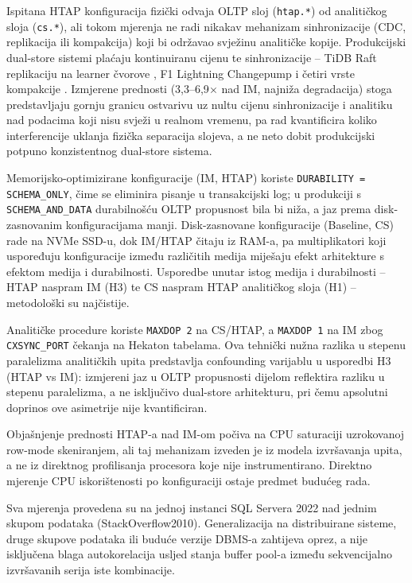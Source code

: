 Ispitana HTAP konfiguracija fizički odvaja OLTP sloj (\texttt{htap.*}) od analitičkog sloja (\texttt{cs.*}), ali tokom mjerenja ne radi nikakav mehanizam sinhronizacije (CDC, replikacija ili kompakcija) koji bi održavao svježinu analitičke kopije. Produkcijski dual-store sistemi plaćaju kontinuiranu cijenu te sinhronizacije -- TiDB Raft replikaciju na learner čvorove \cite{huang2020tidb}, F1 Lightning Changepump i četiri vrste kompakcije \cite{yang2020f1}. Izmjerene prednosti (3,3--6,9$\times$ nad IM, najniža degradacija) stoga predstavljaju gornju granicu ostvarivu uz nultu cijenu sinhronizacije i analitiku nad podacima koji nisu svježi u realnom vremenu, pa rad kvantificira koliko interferencije uklanja fizička separacija slojeva, a ne neto dobit produkcijski potpuno konzistentnog dual-store sistema.

Memorijsko-optimizirane konfiguracije (IM, HTAP) koriste \texttt{DURABILITY\allowbreak{} =\allowbreak{} SCHEMA\_ONLY}, čime se eliminira pisanje u transakcijski log; u produkciji s \texttt{SCHEMA\_AND\_DATA} durabilnošću OLTP propusnost bila bi niža, a jaz prema disk-zasnovanim konfiguracijama manji. Disk-zasnovane konfiguracije (Baseline, CS) rade na NVMe SSD-u, dok IM/HTAP čitaju iz RAM-a, pa multiplikatori koji uspoređuju konfiguracije između različitih medija miješaju efekt arhitekture s efektom medija i durabilnosti. Usporedbe unutar istog medija i durabilnosti -- HTAP naspram IM (H3) te CS naspram HTAP analitičkog sloja (H1) -- metodološki su najčistije.

Analitičke procedure koriste \texttt{MAXDOP 2} na CS/HTAP, a \texttt{MAXDOP 1} na IM zbog \texttt{CXSYNC\_PORT} čekanja na Hekaton tabelama. Ova tehnički nužna razlika u stepenu paralelizma analitičkih upita predstavlja confounding varijablu u usporedbi H3 (HTAP vs IM): izmjereni jaz u OLTP propusnosti dijelom reflektira razliku u stepenu paralelizma, a ne isključivo dual-store arhitekturu, pri čemu apsolutni doprinos ove asimetrije nije kvantificiran.

Objašnjenje prednosti HTAP-a nad IM-om počiva na CPU saturaciji uzrokovanoj row-mode skeniranjem, ali taj mehanizam izveden je iz modela izvršavanja upita, a ne iz direktnog profilisanja procesora koje nije instrumentirano. Direktno mjerenje CPU iskorištenosti po konfiguraciji ostaje predmet budućeg rada.

Sva mjerenja provedena su na jednoj instanci SQL Servera 2022 nad jednim skupom podataka (StackOverflow2010). Generalizacija na distribuirane sisteme, druge skupove podataka ili buduće verzije DBMS-a zahtijeva oprez, a nije isključena blaga autokorelacija usljed stanja buffer pool-a između sekvencijalno izvršavanih serija iste kombinacije.
